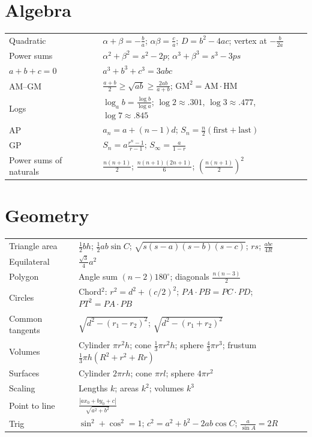 \documentclass[11pt,a4paper,openany]{report}
\begin{document}
\section*{Algebra}
\begin{tabular}{>{\raggedright}p{5.4cm}>{\raggedright\arraybackslash}p{9.6cm}}
\toprule
Quadratic & $\alpha+\beta=-\frac ba$; $\alpha\beta=\frac ca$; $D=b^2-4ac$; vertex at $-\frac b{2a}$\\
Power sums & $\alpha^2+\beta^2=s^2-2p$; $\alpha^3+\beta^3=s^3-3ps$\\
$a+b+c=0$ & $a^3+b^3+c^3=3abc$\\
AM--GM & $\frac{a+b}2\ge\sqrt{ab}\ge\frac{2ab}{a+b}$; $\text{GM}^2=\text{AM}\cdot\text{HM}$\\
Logs & $\log_ab=\frac{\log b}{\log a}$; $\log2\approx.301$, $\log3\approx.477$, $\log7\approx.845$\\
AP & $a_n=a+(n-1)d$; $S_n=\frac n2(\text{first}+\text{last})$\\
GP & $S_n=a\frac{r^n-1}{r-1}$; $S_\infty=\frac a{1-r}$\\
Power sums of naturals & $\frac{n(n+1)}2$; $\frac{n(n+1)(2n+1)}6$; $\left(\frac{n(n+1)}2\right)^2$\\
\bottomrule
\end{tabular}

\section*{Geometry}
\begin{tabular}{>{\raggedright}p{5.4cm}>{\raggedright\arraybackslash}p{9.6cm}}
\toprule
Triangle area & $\frac12bh$; $\frac12ab\sin C$; $\sqrt{s(s-a)(s-b)(s-c)}$; $rs$; $\frac{abc}{4R}$\\
Equilateral & $\frac{\sqrt3}4a^2$\\
Polygon & Angle sum $(n-2)180^\circ$; diagonals $\frac{n(n-3)}2$\\
Circles & Chord$^2$: $r^2=d^2+(c/2)^2$; $PA\cdot PB=PC\cdot PD$; $PT^2=PA\cdot PB$\\
Common tangents & $\sqrt{d^2-(r_1-r_2)^2}$; $\sqrt{d^2-(r_1+r_2)^2}$\\
Volumes & Cylinder $\pi r^2h$; cone $\frac13\pi r^2h$; sphere $\frac43\pi r^3$; frustum $\frac13\pi h(R^2+r^2+Rr)$\\
Surfaces & Cylinder $2\pi rh$; cone $\pi rl$; sphere $4\pi r^2$\\
Scaling & Lengths $k$; areas $k^2$; volumes $k^3$\\
Point to line & $\frac{|ax_0+by_0+c|}{\sqrt{a^2+b^2}}$\\
Trig & $\sin^2+\cos^2=1$; $c^2=a^2+b^2-2ab\cos C$; $\frac a{\sin A}=2R$\\
\bottomrule
\end{tabular}
\end{document}
